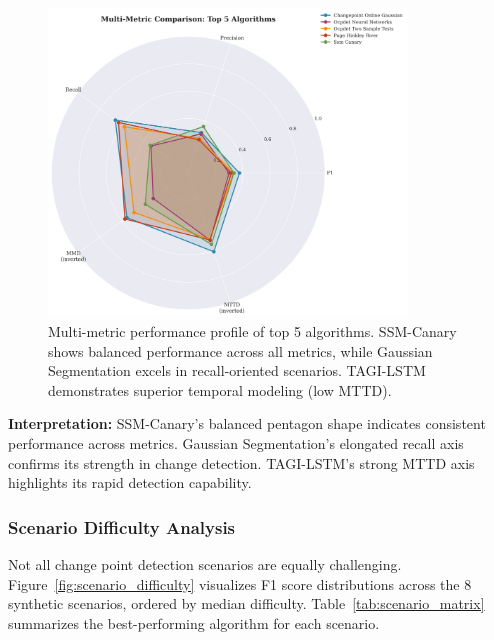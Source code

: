 \documentclass[journal,article,submit,pdftex,moreauthors]{Definitions/mdpi}
\begin{document}
\begin{figure}[ht]
\centering
\includegraphics[width=0.85\textwidth]{figures/fig_radar_metrics.png}
\caption{Multi-metric performance profile of top 5 algorithms. SSM-Canary shows balanced performance across all metrics, while Gaussian Segmentation excels in recall-oriented scenarios. TAGI-LSTM demonstrates superior temporal modeling (low MTTD).}
\label{fig:radar_metrics}
\end{figure}

\textbf{Interpretation:} SSM-Canary's balanced pentagon shape indicates consistent performance across metrics. Gaussian Segmentation's elongated recall axis confirms its strength in change detection. TAGI-LSTM's strong MTTD axis highlights its rapid detection capability.


\subsubsection{Scenario Difficulty Analysis}

Not all change point detection scenarios are equally challenging. Figure~\ref{fig:scenario_difficulty} visualizes F1 score distributions across the 8 synthetic scenarios, ordered by median difficulty. Table~\ref{tab:scenario_matrix} summarizes the best-performing algorithm for each scenario.
\end{document}

